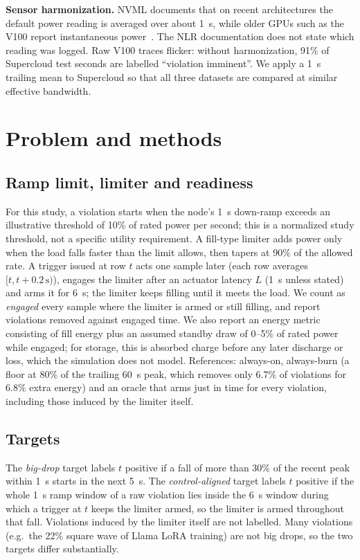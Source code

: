 \documentclass[conference]{IEEEtran}
\begin{document}
\textbf{Sensor harmonization.} NVML documents that on recent architectures the default power reading is
averaged over about 1~s, while older GPUs such as the V100 report instantaneous power~\cite{nvml}. The NLR
documentation does not state which reading was logged. Raw V100 traces flicker: without harmonization,
91\% of Supercloud test seconds are labelled ``violation imminent''. We apply a 1~s trailing mean to
Supercloud so that all three datasets are compared at similar effective bandwidth.

\section{Problem and methods}
\subsection{Ramp limit, limiter and readiness}
For this study, a violation starts when the node's 1~s down-ramp exceeds an illustrative threshold of
10\% of rated power per second; this is a normalized study threshold, not a specific utility requirement. A fill-type limiter adds
power only when the load falls faster than the limit allows, then tapers at 90\% of the allowed rate. A trigger
issued at row $t$ acts one sample later (each row averages $[t, t{+}0.2\,\mathrm{s})$), engages the
limiter after an actuator latency $L$ (1~s unless stated) and arms it for 6~s; the limiter keeps
filling until it meets the load. We count as \emph{engaged} every sample where the limiter is armed or
still filling, and report violations removed against engaged time. We also report an energy metric
consisting of fill energy plus an assumed standby draw of 0--5\% of rated power while engaged; for
storage, this is absorbed charge before any later discharge or loss, which the simulation does not model. References: always-on, always-burn (a floor at 80\% of the trailing 60~s peak,
which removes only 6.7\% of violations for 6.8\% extra energy) and an oracle that
arms just in time for every violation, including those induced by the limiter itself.

\subsection{Targets}
The \emph{big-drop} target labels $t$ positive if a fall of more than 30\% of the recent peak within
1~s starts in the next 5~s. The \emph{control-aligned} target labels $t$ positive if the whole 1~s ramp window
of a raw violation lies inside the 6~s window during which a trigger at $t$ keeps the limiter armed, so
the limiter is armed throughout that fall. Violations induced by the limiter itself are not labelled.
Many violations (e.g.\ the 22\% square wave of Llama LoRA training) are not big drops, so the two
targets differ substantially.
\end{document}
